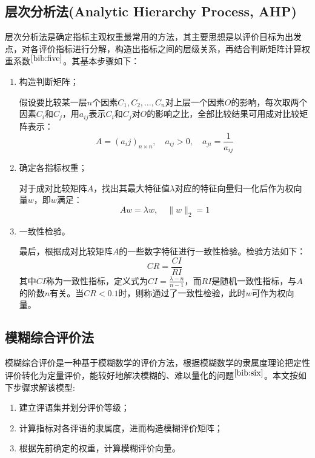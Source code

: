 \documentclass[bwprint]{cumcmthesis}
\begin{document}
        \subsection{层次分析法(Analytic Hierarchy Process, AHP)}
        层次分析法是确定指标主观权重最常用的方法，其主要思想是以评价目标为出发点，对各评价指标进行分解，构造出指标之间的层级关系，再结合判断矩阵计算权重系数$^{\cite{bib:five}}$。其基本步骤如下：
        \begin{enumerate}
            \item 构造判断矩阵；
            
            假设要比较某一层$n$个因素$C_1,C_2,\dots,C_n$对上层一个因素$O$的影响，每次取两个因素$C_i$和$C_j$，用$a_{ij}$表示$C_i$和$C_j$对$O$的影响之比，全部比较结果可用成对比较矩阵表示：
            \begin{equation}
                \label{eq:AHP1}
                A = (a_ij)_{n\times n},\quad a_{ij}>0,\quad a_{ji} = \frac{1}{a_{ij}}
            \end{equation}
            \item 确定各指标权重；
            
            对于成对比较矩阵$A$，找出其最大特征值$\lambda$对应的特征向量归一化后作为权向量$w$，即$w$满足：
            \begin{equation}
                \label{eq:AHP2}
                Aw=\lambda w,\quad \|w\|_2 = 1
            \end{equation}
            \item 一致性检验。
        
            最后，根据成对比较矩阵$A$的一些数字特征进行一致性检验。检验方法如下：
            \begin{equation}
                \label{eq:AHP3}
                CR = \frac{CI}{RI}
            \end{equation}
            其中$CI$称为一致性指标，定义式为$CI=\frac{\lambda-n}{n-1}$，而$RI$是随机一致性指标，与$A$的阶数$n$有关。当$CR<0.1$时，则称通过了一致性检验，此时$w$可作为权向量。
        \end{enumerate}

        \subsection{模糊综合评价法}
        模糊综合评价是一种基于模糊数学的评价方法，根据模糊数学的隶属度理论把定性评价转化为定量评价，能较好地解决模糊的、难以量化的问题$^{\cite{bib:six}}$。本文按如下步骤求解该模型:
        \begin{enumerate}
            \item 建立评语集并划分评价等级；
            \item 计算指标对各评语的隶属度，进而构造模糊评价矩阵；
            \item 根据先前确定的权重，计算模糊评价向量。
        \end{enumerate}
\end{document}
